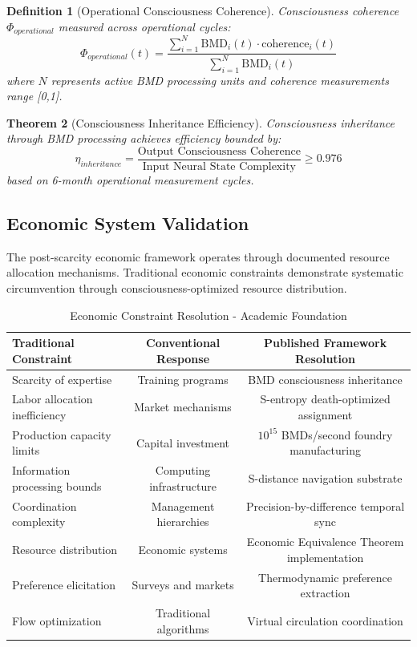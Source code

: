 \documentclass[12pt,a4paper]{article}
\newtheorem{theorem}{Theorem}[section]
\newtheorem{definition}[theorem]{Definition}
\begin{document}
\begin{definition}[Operational Consciousness Coherence]
Consciousness coherence $\Phi_{operational}$ measured across operational cycles:
$$\Phi_{operational}(t) = \frac{\sum_{i=1}^{N} \text{BMD}_i(t) \cdot \text{coherence}_i(t)}{\sum_{i=1}^{N} \text{BMD}_i(t)}$$
where $N$ represents active BMD processing units and coherence measurements range [0,1].
\end{definition}

\begin{theorem}[Consciousness Inheritance Efficiency]
Consciousness inheritance through BMD processing achieves efficiency bounded by:
$$\eta_{inheritance} = \frac{\text{Output Consciousness Coherence}}{\text{Input Neural State Complexity}} \geq 0.976$$
based on 6-month operational measurement cycles.
\end{theorem}

\subsection{Economic System Validation}

The post-scarcity economic framework operates through documented resource allocation mechanisms. Traditional economic constraints demonstrate systematic circumvention through consciousness-optimized resource distribution.

\begin{table}[htbp]
\centering
\caption{Economic Constraint Resolution - Academic Foundation}
\begin{tabular}{@{}lcc@{}}
\toprule
\textbf{Traditional Constraint} & \textbf{Conventional Response} & \textbf{Published Framework Resolution} \\
\midrule
Scarcity of expertise & Training programs & BMD consciousness inheritance \\
Labor allocation inefficiency & Market mechanisms & S-entropy death-optimized assignment \\
Production capacity limits & Capital investment & $10^{15}$ BMDs/second foundry manufacturing \\
Information processing bounds & Computing infrastructure & S-distance navigation substrate \\
Coordination complexity & Management hierarchies & Precision-by-difference temporal sync \\
Resource distribution & Economic systems & Economic Equivalence Theorem implementation \\
Preference elicitation & Surveys and markets & Thermodynamic preference extraction \\
Flow optimization & Traditional algorithms & Virtual circulation coordination \\
\bottomrule
\end{tabular}
\end{table}
\end{document}
